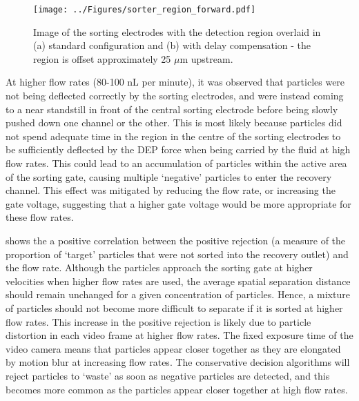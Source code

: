 \begin{figure}
 \centering
 \texttt{[image: ../Figures/sorter\_region\_forward.pdf]}
 \caption[Position of the detection region during the standard sorting configuration and with delay compensation.]{Image of the sorting electrodes with the detection region overlaid in (a) standard configuration and (b) with delay compensation - the region is offset approximately 25 $\mu$m upstream.}
 \label{fig:sorter_region_forward}
\end{figure}

At higher flow rates (80-100 nL per minute), it was observed that particles were not being deflected correctly by the sorting electrodes, and were instead coming to a near standstill in front of the central sorting electrode before being slowly pushed down one channel or the other. This is most likely because particles did not spend adequate time in the region in the centre of the sorting electrodes to be sufficiently deflected by the DEP force when being carried by the fluid at high flow rates. This could lead to an accumulation of particles within the active area of the sorting gate, causing multiple `negative' particles to enter the recovery channel. This effect was mitigated by reducing the flow rate, or increasing the gate voltage, suggesting that a higher gate voltage would be more appropriate for these flow rates.

 shows the a positive correlation between the positive rejection (a measure of the proportion of `target' particles that were not sorted into the recovery outlet) and the flow rate. Although the particles approach the sorting gate at higher velocities when higher flow rates are used, the average spatial separation distance should remain unchanged for a given concentration of particles. Hence, a mixture of particles should not become more difficult to separate if it is sorted at higher flow rates. This increase in the positive rejection is likely due to particle distortion in each video frame at higher flow rates. The fixed exposure time of the video camera means that particles appear closer together as they are elongated by motion blur at increasing flow rates. The conservative decision algorithms will reject particles to `waste' as soon as negative particles are detected, and this becomes more common as the particles appear closer together at high flow rates.

